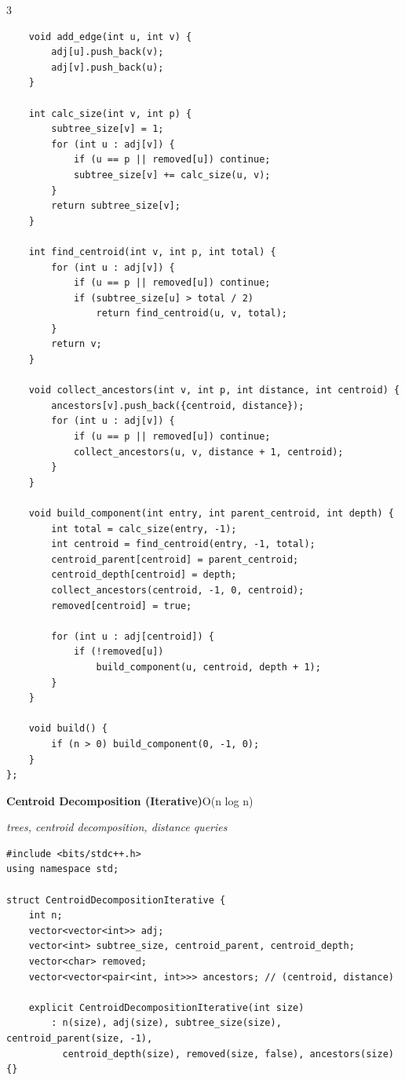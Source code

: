 \documentclass[8pt,a4paper,landscape]{article}
\begin{document}
\begin{multicols}{3}
\begin{lstlisting}
    void add_edge(int u, int v) {
        adj[u].push_back(v);
        adj[v].push_back(u);
    }

    int calc_size(int v, int p) {
        subtree_size[v] = 1;
        for (int u : adj[v]) {
            if (u == p || removed[u]) continue;
            subtree_size[v] += calc_size(u, v);
        }
        return subtree_size[v];
    }

    int find_centroid(int v, int p, int total) {
        for (int u : adj[v]) {
            if (u == p || removed[u]) continue;
            if (subtree_size[u] > total / 2)
                return find_centroid(u, v, total);
        }
        return v;
    }

    void collect_ancestors(int v, int p, int distance, int centroid) {
        ancestors[v].push_back({centroid, distance});
        for (int u : adj[v]) {
            if (u == p || removed[u]) continue;
            collect_ancestors(u, v, distance + 1, centroid);
        }
    }

    void build_component(int entry, int parent_centroid, int depth) {
        int total = calc_size(entry, -1);
        int centroid = find_centroid(entry, -1, total);
        centroid_parent[centroid] = parent_centroid;
        centroid_depth[centroid] = depth;
        collect_ancestors(centroid, -1, 0, centroid);
        removed[centroid] = true;

        for (int u : adj[centroid]) {
            if (!removed[u])
                build_component(u, centroid, depth + 1);
        }
    }

    void build() {
        if (n > 0) build_component(0, -1, 0);
    }
};
\end{lstlisting}
\vspace{1pt}
\textbf{Centroid Decomposition (Iterative)}\hfill{\scriptsize O(n log n)}\par
{\scriptsize\itshape trees, centroid decomposition, distance queries}\par
\begin{lstlisting}
#include <bits/stdc++.h>
using namespace std;

struct CentroidDecompositionIterative {
    int n;
    vector<vector<int>> adj;
    vector<int> subtree_size, centroid_parent, centroid_depth;
    vector<char> removed;
    vector<vector<pair<int, int>>> ancestors; // (centroid, distance)

    explicit CentroidDecompositionIterative(int size)
        : n(size), adj(size), subtree_size(size), centroid_parent(size, -1),
          centroid_depth(size), removed(size, false), ancestors(size) {}


\end{lstlisting}
\end{multicols}
\end{document}
